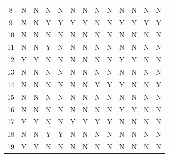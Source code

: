 \documentclass[runningheads]{llncs}
\begin{document}
\begin{table}[ht]
\begin{center}
\begin{tabular}{|c|c|c|c|c|c|c|c|c|c|c|c|c|}
8                            & N           & N          & N           & N          & N           & N          & N           & N          & N           & N          & N           & N          \\
9                            & N           & N          & Y           & Y          & Y           & Y          & N           & N          & Y           & Y          & Y           & Y          \\
10                           & N           & N          & N           & N          & N           & N          & N           & N          & N           & N          & N           & N          \\
11                           & N           & N          & Y           & N          & N           & N          & N           & N          & N           & N          & N           & N          \\
12                           & Y           & Y          & N           & N          & N           & N          & N           & N          & Y           & Y          & N           & N          \\
13                           & N           & N          & N           & N          & N           & N          & N           & N          & N           & N          & N           & N          \\
14                           & N           & N          & N           & N          & N           & N          & Y           & Y          & Y           & N          & N           & Y          \\
15                           & N           & N          & N           & N          & N           & N          & N           & N          & N           & N          & N           & N          \\
16                           & N           & N          & N           & N          & N           & N          & N           & N          & Y           & Y          & N           & N          \\
17                           & Y           & Y          & N           & N          & Y           & Y          & Y           & Y          & N           & N          & N           & N          \\
18                           & N           & N          & Y           & Y          & N           & N          & N           & N          & N           & N          & N           & N          \\
19                           & Y           & Y          & N           & N          & N           & N          & N           & N          & N           & N          & N           & N         
\end{tabular}
\end{center}
\end{table}
\end{document}
